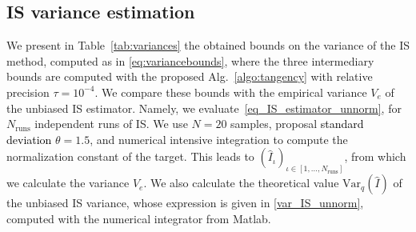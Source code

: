 \documentclass[review]{elsarticle}
\newcommand{\cblue}{\textcolor{black}}
\begin{document}




\subsection{IS variance estimation}
\label{sec:expe2}

We present in Table~\ref{tab:variances} the obtained bounds on the variance of the IS method, computed as in \eqref{eq:variancebounds}, where the three intermediary bounds are computed with the proposed Alg.~\ref{algo:tangency} with relative precision $\tau = 10^{-4}$. We compare these bounds with the empirical variance $V_e$ of the unbiased IS estimator. Namely, we evaluate~\eqref{eq_IS_estimator_unnorm}, for $N_{\text{runs}}$ independent runs of IS. We use  $N=20$ samples, proposal \cblue{standard deviation} $\theta = 1.5$, and numerical intensive integration to compute the normalization constant of the target. This leads to $(\widehat{I}_\iota)_{\iota \in [1, \dots, N_{\text{runs}}]}$, from which we calculate the variance $V_e$. We also calculate the theoretical value $\text{Var}_q(\widehat{I})$ of the unbiased IS variance, whose expression is given in \eqref{var_IS_unnorm}, computed with the numerical integrator from Matlab. 
\end{document}
